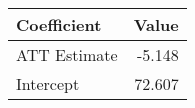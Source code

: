 \begin{tabular}{lr}
\toprule
 Coefficient &  Value \\
\midrule
ATT Estimate & -5.148 \\
   Intercept & 72.607 \\
\bottomrule
\end{tabular}
